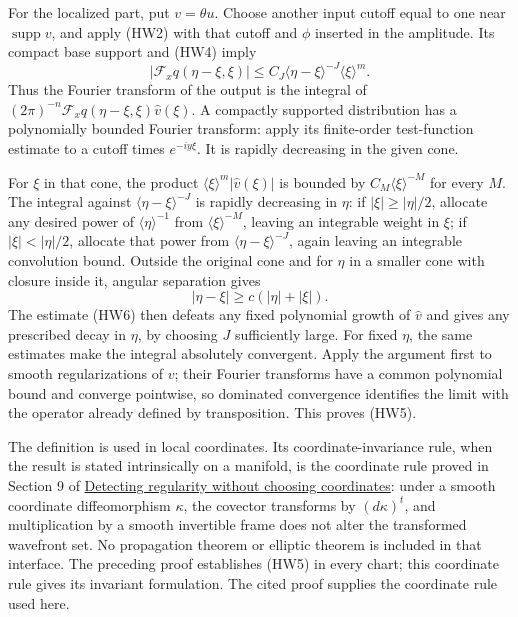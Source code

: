 \documentclass[
  11pt,
]{article}
\begin{document}
For the localized part, put \(v=\theta u\). Choose another input cutoff
equal to one near \(\operatorname{supp}v\), and apply (HW2) with that
cutoff and \(\phi\) inserted in the amplitude. Its compact base support
and (HW4) imply \[
 |\mathcal F_x q(\eta-\xi,\xi)|
              \leq C_J\langle\eta-\xi\rangle^{-J}\langle\xi\rangle^m.
                                                               \tag{HW6}
\] Thus the Fourier transform of the output is the integral of
\((2\pi)^{-n}\mathcal F_xq(\eta-\xi,\xi)\widehat v(\xi)\). A compactly
supported distribution has a polynomially bounded Fourier transform:
apply its finite-order test-function estimate to a cutoff times
\(e^{-iy\xi}\). It is rapidly decreasing in the given cone.

For \(\xi\) in that cone, the product
\(\langle\xi\rangle^m|\widehat v(\xi)|\) is bounded by
\(C_M\langle\xi\rangle^{-M}\) for every \(M\). The integral against
\(\langle\eta-\xi\rangle^{-J}\) is rapidly decreasing in \(\eta\): if
\(|\xi|\geq|\eta|/2\), allocate any desired power of
\(\langle\eta\rangle^{-1}\) from \(\langle\xi\rangle^{-M}\), leaving an
integrable weight in \(\xi\); if \(|\xi|<|\eta|/2\), allocate that power
from \(\langle\eta-\xi\rangle^{-J}\), again leaving an integrable
convolution bound. Outside the original cone and for \(\eta\) in a
smaller cone with closure inside it, angular separation gives \[
                   |\eta-\xi|\geq c(|\eta|+|\xi|).             \tag{HW7}
\] The estimate (HW6) then defeats any fixed polynomial growth of
\(\widehat v\) and gives any prescribed decay in \(\eta\), by choosing
\(J\) sufficiently large. For fixed \(\eta\), the same estimates make
the integral absolutely convergent. Apply the argument first to smooth
regularizations of \(v\); their Fourier transforms have a common
polynomial bound and converge pointwise, so dominated convergence
identifies the limit with the operator already defined by transposition.
This proves (HW5).

The definition is used in local coordinates. Its coordinate-invariance
rule, when the result is stated intrinsically on a manifold, is the
coordinate rule proved in Section 9 of
\href{geometric-microlocal-calculus.pdf}{Detecting regularity without
choosing coordinates}: under a smooth coordinate diffeomorphism
\(\kappa\), the covector transforms by \((d\kappa)^t\), and
multiplication by a smooth invertible frame does not alter the
transformed wavefront set. No propagation theorem or elliptic theorem is
included in that interface. The preceding proof establishes (HW5) in
every chart; this coordinate rule gives its invariant formulation. The
cited proof supplies the coordinate rule used here.
\end{document}
